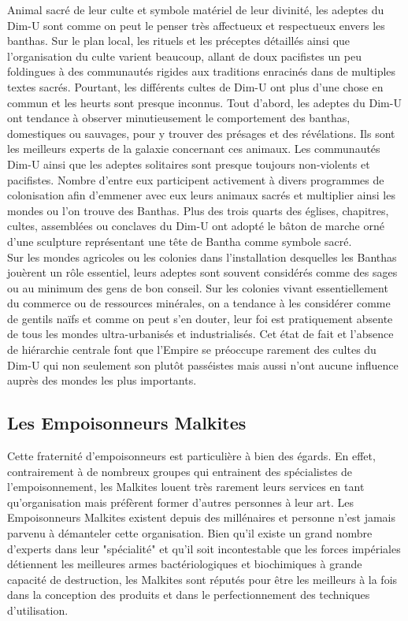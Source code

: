\documentclass[twoside]{article}
\begin{document}
Animal sacré de leur culte et symbole matériel de leur divinité, les adeptes du Dim-U sont comme on peut le penser très affectueux et respectueux envers les banthas. Sur le plan local, les rituels et les préceptes détaillés ainsi que l'organisation du culte varient beaucoup, allant de doux pacifistes un peu foldingues à des communautés rigides aux traditions enracinés dans de multiples textes sacrés. Pourtant, les différents cultes de Dim-U ont plus d'une chose en commun et les heurts sont presque inconnus. Tout d'abord, les adeptes du Dim-U ont tendance à observer minutieusement le comportement des banthas, domestiques ou sauvages, pour y trouver des présages et des révélations. Ils sont les meilleurs experts de la galaxie concernant ces animaux. Les communautés Dim-U ainsi que les adeptes solitaires sont presque toujours non-violents et pacifistes. Nombre d'entre eux participent activement à divers programmes de colonisation afin d'emmener avec eux leurs animaux sacrés et multiplier ainsi les mondes ou l'on trouve des Banthas. Plus des trois quarts des églises, chapitres, cultes, assemblées ou conclaves du Dim-U ont adopté le bâton de marche orné d'une sculpture représentant une tête de Bantha comme symbole sacré. \\

Sur les mondes agricoles ou les colonies dans l'installation desquelles les Banthas jouèrent un rôle essentiel, leurs adeptes sont souvent considérés comme des sages ou au minimum des gens de bon conseil. Sur les colonies vivant essentiellement du commerce ou de ressources minérales, on a tendance à les considérer comme de gentils naïfs et comme on peut s'en douter, leur foi est pratiquement absente de tous les mondes ultra-urbanisés et industrialisés. Cet état de fait et l'absence de hiérarchie centrale font que l'Empire se préoccupe rarement des cultes du Dim-U qui non seulement son plutôt passéistes mais aussi n'ont aucune influence auprès des mondes les plus importants.

\subsection{Les Empoisonneurs Malkites}
Cette fraternité d'empoisonneurs est particulière à bien des égards. En effet, contrairement à de nombreux groupes qui entrainent des spécialistes de l'empoisonnement, les Malkites louent très rarement leurs services en tant qu'organisation mais préfèrent former d'autres personnes à leur art.
Les Empoisonneurs Malkites existent depuis des millénaires et personne n'est jamais parvenu à démanteler cette organisation. Bien qu'il existe un grand nombre d'experts dans leur "spécialité" et qu'il soit incontestable que les forces impériales détiennent les meilleures armes bactériologiques et biochimiques à grande capacité de destruction, les Malkites sont réputés pour être les meilleurs à la fois dans la conception des produits et dans le perfectionnement des techniques d'utilisation.\\
\end{document}

